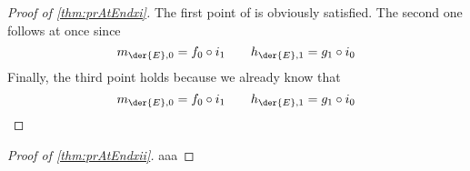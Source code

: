 
\begin{proof}[Proof of \autoref{thm:prAtEndxi}]\label{proof:prAtEndxi}The first point of  is obviously satisfied. The second one follows at once since \[m_{\der {E},0}= f_0\circ i_1 \qquad h_{\der {E},1}= g_{1}\circ i_0\] Finally, the third point holds because we already know that \[m_{\der {E},0}= f_0\circ i_1 \qquad h_{\der {E},1}= g_{1}\circ i_0\]\end{proof}
\begin{proof}[Proof of \autoref{thm:prAtEndxii}]\label{proof:prAtEndxii}aaa\end{proof}
